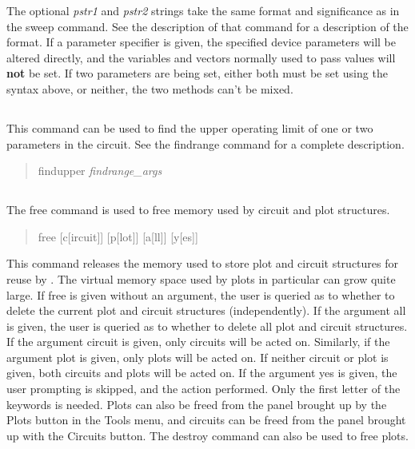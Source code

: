 The optional {\it pstr1} and {\it pstr2} strings take the same format
and significance as in the {\cb sweep} command.  See the description
of that command for a description of the format.  If a parameter
specifier is given, the specified device parameters will be altered
directly, and the variables and vectors normally used to pass values
will {\bf not} be set.  If two parameters are being set, either both
must be set using the syntax above, or neither, the two methods can't
be mixed.

\subsection{}


This command can be used to find the upper operating limit of one or
two parameters in the circuit.  See the {\cb findrange} command for a
complete description.

\begin{quote}
{\vt findupper} {\it findrange\_args}
\end{quote}

\subsection{}


The {\cb free} command is used to free memory used by circuit and plot
structures.
\begin{quote}\vt
free [c[ircuit]] [p[lot]] [a[ll]] [y[es]]
\end{quote}
This command releases the memory used to store plot and circuit
structures for reuse by {\WRspice}.  The virtual memory space used by
plots in particular can grow quite large.  If {\cb free} is given
without an argument, the user is queried as to whether to delete the
current plot and circuit structures (independently).  If the argument
{\vt all} is given, the user is queried as to whether to delete all
plot and circuit structures.  If the argument {\vt circuit} is given,
only circuits will be acted on.  Similarly, if the argument {\vt plot}
is given, only plots will be acted on.  If neither {\vt circuit} or
{\vt plot} is given, both circuits and plots will be acted on.  If the
argument {\vt yes} is given, the user prompting is skipped, and the
action performed.  Only the first letter of the keywords is needed. 
Plots can also be freed from the panel brought up by the {\cb Plots}
button in the {\cb Tools} menu, and circuits can be freed from the
panel brought up with the {\cb Circuits} button.  The {\cb destroy}
command can also be used to free plots.

